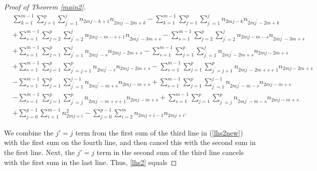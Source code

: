 \documentclass[11pt,reqno]{amsart}
\theoremstyle{definition}
\numberwithin{equation}{section}
\begin{document}
\begin{proof}[Proof of Theorem \ref{main2}]
\begin{equation} \label{lhs2new}
\begin{aligned}
& \sum_{k=1}^{m-1} \sum_{j=1}^{p} \sum_{j^{\prime}=1}^{j} n_{2mj-k+1}n_{2mj^{\prime} - 2m + k} -\sum_{k=1}^{m-1} \sum_{j=1}^{p} \sum_{j^{\prime}=1}^{j} n_{2mj-k}n_{2mj^{\prime} - 2m + k}
\\
& + \sum_{s=1}^{m-1} \sum_{j=2}^{p} \sum_{j^{\prime}=2}^{j} n_{2mj - m - s +1}n_{2mj^{\prime} - 3m+s} - \sum_{s=1}^{m-1} \sum_{j=2}^{p} \sum_{j^{\prime}=2}^{j}n_{2mj-m-s} n_{2mj^{\prime} - 3m+s} \\
& + \sum_{s=1}^{m-1} \sum_{j=1}^{p}  \sum_{j^{\prime}=1}^{j} n_{2mj^{\prime} - s}n_{2mj-2m+s} - \sum_{s=1}^{m-1} \sum_{j=1}^{p}  \sum_{j^{\prime}=1}^{j} n_{2mj^{\prime} - 2m + s}n_{2mj-2m+s} \\ 
&+ \sum_{s=1}^{m-1} \sum_{j=1}^{p}\sum_{j^{\prime}=j+1}^{p} n_{2mj^{\prime} - s}n_{2mj-2m+s} - \sum_{s=1}^{m-1} \sum_{j=1}^{p}\sum_{j^{\prime}=j+1}^{p}n_{2mj^{\prime} - 2m + s + 1} n_{2mj-2m+s} \\
& - \sum_{s=1}^{m-1} \sum_{j=1}^{p} \sum_{j^{\prime}=1}^{j-1} n_{2mj^{\prime} - m + s}n_{2mj-m+s} + \sum_{s=1}^{m-1} \sum_{j=1}^{p} \sum_{j^{\prime}=1}^{j-1} n_{2mj^{\prime} - m - s}n_{2mj-m+s} \\
&- \sum_{s=1}^{m-1} \sum_{j=1}^{p} \sum_{j^{\prime}=j}^{p} n_{2mj^{\prime} - m + s + 1}n_{2mj-m+s} + \sum_{s=1}^{m-1} \sum_{j=1}^{p} \sum_{j^{\prime}=j}^{p}n_{2mj^{\prime} - m - s}n_{2mj-m+s} \\
& + \sum_{j=0}^{p-1} \sum_{i=1}^{m-1} n_{2mj+i}^2 - \sum_{j=0}^{p-1} \sum_{i=2}^{m} n_{2mj+i-1}n_{2mj+i}.
\end{aligned}
\end{equation}

We combine the $j'=j$ term from the first sum of the third line in (\ref{lhs2new}) with the first sum on the fourth line, and then cancel this with the second sum in the first line.    Next, the $j'=j$ term in the second sum of the third line cancels with the first sum in the last line. Thus, \eqref{lhs2} equals


\end{proof}
\end{document}
